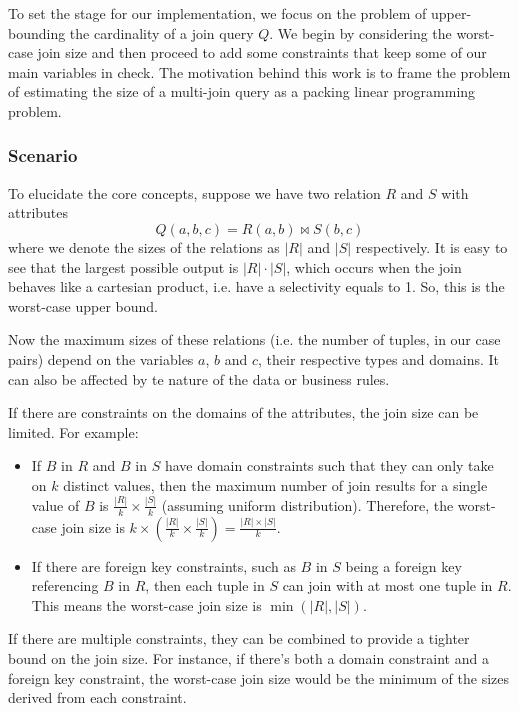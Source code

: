 To set the stage for our implementation,
we focus on the problem of upper-bounding the
cardinality of a join query $Q$.
We begin by considering the worst-case join size and then proceed
to add some constraints that keep some of our main variables in check.
The motivation behind this work is to frame the problem of
estimating the size of a multi-join query as a packing
linear programming problem.
\subsubsection{Scenario}
To elucidate the core concepts,
suppose we have two relation $R$ and $S$ with attributes
\[
    Q(a, b, c) = R(a, b) \Join S(b, c)
\]
where we denote the sizes of the relations as
$|R|$ and $|S|$ respectively.
It is easy to see that the largest possible output is $|R| \cdot |S|$, which occurs when the join
behaves like a cartesian product, i.e. have a selectivity equals to 1. So, this is the worst-case
upper bound.

Now the maximum sizes of these relations (i.e. the number of tuples, in our case pairs) depend on the
variables $a$, $b$ and $c$, their respective types and domains. It can also
be affected by te nature of the data or business rules.

If there are constraints on the domains of the attributes, the join size can be limited. For example:

\begin{itemize}
    \item If \( B \) in \( R \) and \( B \) in \( S \) have domain constraints such that they can only take on \( k \) distinct values, then the maximum number of join results for a single value of \( B \) is \( \frac{|R|}{k} \times \frac{|S|}{k} \) (assuming uniform distribution). Therefore, the worst-case join size is \( k \times \left( \frac{|R|}{k} \times \frac{|S|}{k} \right) = \frac{|R| \times |S|}{k} \).

    \item If there are foreign key constraints, such as \( B \) in \( S \) being a foreign key referencing \( B \) in \( R \), then each tuple in \( S \) can join with at most one tuple in \( R \). This means the worst-case join size is \( \min(|R|, |S|) \).
\end{itemize}

If there are multiple constraints, they can be combined to provide a tighter bound on the join size. For instance, if there's both a domain constraint and a foreign key constraint, the worst-case join size would be the minimum of the sizes derived from each constraint.

